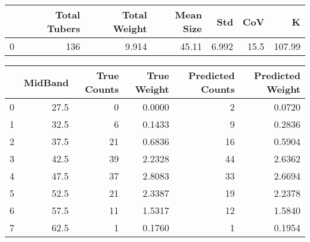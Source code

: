 \begin{tabular}{lrrrrrr}
\toprule
{} &  Total Tubers &  Total Weight &  Mean Size &    Std &   CoV &       K \\
\midrule
0 &           136 &         9.914 &      45.11 &  6.992 &  15.5 &  107.99 \\
\bottomrule
\end{tabular}

\begin{tabular}{lrrrrr}
\toprule
{} &  MidBand &  True Counts &  True Weight &  Predicted Counts &  Predicted Weight \\
\midrule
0 &     27.5 &            0 &       0.0000 &                 2 &            0.0720 \\
1 &     32.5 &            6 &       0.1433 &                 9 &            0.2836 \\
2 &     37.5 &           21 &       0.6836 &                16 &            0.5904 \\
3 &     42.5 &           39 &       2.2328 &                44 &            2.6362 \\
4 &     47.5 &           37 &       2.8083 &                33 &            2.6694 \\
5 &     52.5 &           21 &       2.3387 &                19 &            2.2378 \\
6 &     57.5 &           11 &       1.5317 &                12 &            1.5840 \\
7 &     62.5 &            1 &       0.1760 &                 1 &            0.1954 \\
\bottomrule
\end{tabular}

